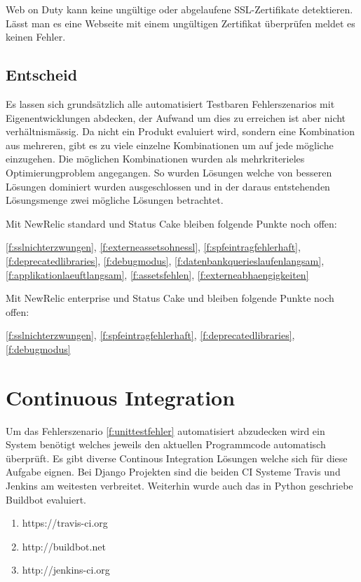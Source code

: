 Web on Duty kann keine ungültige oder abgelaufene SSL-Zertifikate detektieren. Lässt man es eine Webseite mit einem ungültigen Zertifikat überprüfen meldet es keinen Fehler.

\subsection{Entscheid}
\label{sub:entscheid_monitoring}
Es lassen sich grundsätzlich alle automatisiert Testbaren Fehlerszenarios mit Eigenentwicklungen abdecken, der Aufwand um dies zu erreichen ist aber nicht verhältnismässig. Da nicht ein Produkt evaluiert wird, sondern eine Kombination aus mehreren, gibt es zu viele einzelne Kombinationen um auf jede mögliche einzugehen. Die möglichen Kombinationen wurden als mehrkriterieles Optimierungproblem angegangen. So wurden Lösungen welche von besseren Lösungen dominiert wurden ausgeschlossen und in der daraus entstehenden Lösungsmenge zwei mögliche Lösungen betrachtet.


Mit NewRelic standard und Status Cake bleiben folgende Punkte noch offen:

\ref{f:sslnichterzwungen}, \ref{f:externeassetsohnessl}, \ref{f:spfeintragfehlerhaft}, \ref{f:deprecatedlibraries}, \ref{f:debugmodus}, \ref{f:datenbankquerieslaufenlangsam}, \ref{f:applikationlaeuftlangsam}, \ref{f:assetsfehlen}, \ref{f:externeabhaengigkeiten}

Mit NewRelic enterprise und Status Cake und bleiben folgende Punkte noch offen:

\ref{f:sslnichterzwungen}, \ref{f:spfeintragfehlerhaft}, \ref{f:deprecatedlibraries}, \ref{f:debugmodus}

\section{Continuous Integration}
\label{sec:continuous_integration_evaluation}
Um das Fehlerszenario \ref{f:unittestfehler} automatisiert abzudecken wird ein System benötigt welches jeweils den aktuellen Programmcode automatisch überprüft. Es gibt diverse Continous Integration Lösungen welche sich für diese Aufgabe eignen. Bei Django Projekten sind die beiden CI Systeme Travis und Jenkins am weitesten verbreitet. Weiterhin wurde auch das in Python geschriebe Buildbot evaluiert.

\begin{enumerate}
  \item https://travis-ci.org
  \item http://buildbot.net
  \item http://jenkins-ci.org
\end{enumerate}

